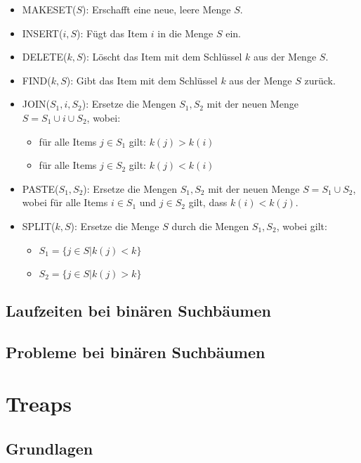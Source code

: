 \documentclass[a4paper]{scrreprt}
\theoremstyle{definition}
\begin{document}
\begin{itemize} %
\item MAKESET($S$): Erschafft eine neue, leere Menge $S$.
\item INSERT($i, S$): Fügt das Item $i$ in die Menge $S$ ein.
\item DELETE($k, S$): Löscht das Item mit dem Schlüssel $k$ aus der Menge $S$.
\item FIND($k, S$): Gibt das Item mit dem Schlüssel $k$ aus der Menge $S$ zurück.
\item JOIN($S_1, i, S_2$): Ersetze die Mengen $S_1, S_2$ mit der neuen Menge $S = S_1 \cup {i} \cup S_2$, wobei:
	\begin{itemize}
	\item für alle Items $j \in S_1$ gilt: $k(j) > k(i)$
	\item für alle Items $j \in S_2$ gilt: $k(j) < k(i)$
	\end{itemize} 
\item PASTE($S_1, S_2$): Ersetze die Mengen $S_1, S_2$ mit der neuen Menge $S = S_1 \cup S_2$, wobei für alle Items $i \in S_1$ und $j \in S_2$ gilt, dass $k(i) < k(j)$.
\item SPLIT($k, S$): Ersetze die Menge $S$ durch die Mengen $S_1, S_2$, wobei gilt:
	\begin{itemize}
	\item $S_1 = \{j \in S | k(j) < k\}$
	\item $S_2 = \{j \in S | k(j) > k\}$
	\end{itemize}
\end{itemize}

\section{Laufzeiten bei binären Suchbäumen}
\label{sec:binaryruntime}

\section{Probleme bei binären Suchbäumen}
\label{sec:binaryproblems}

\chapter{Treaps}
\label{sec:treaps}

\section{Grundlagen}
\label{sec:treapsbasics}
\end{document}
